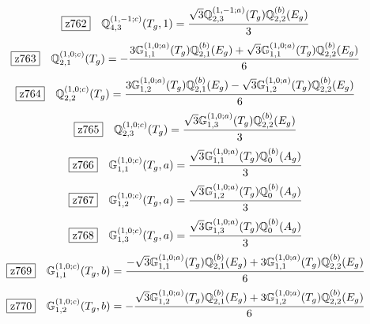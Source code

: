 \documentclass[fleqn,10pt,landscape]{jsarticle}
\begin{document}
\begin{dmath*}
\hspace*{3mm}\fbox{z762}\quad \mathbb{Q}_{4,3}^{(1,-1;c)}(T_{g},1)=\frac{\sqrt{3} \mathbb{Q}_{2,3}^{(1,-1;a)}(T_{g}) \mathbb{Q}_{2,2}^{(b)}(E_{g})}{3}
\end{dmath*}
\begin{dmath*}
\hspace*{3mm}\fbox{z763}\quad \mathbb{Q}_{2,1}^{(1,0;c)}(T_{g})=- \frac{3 \mathbb{G}_{1,1}^{(1,0;a)}(T_{g}) \mathbb{Q}_{2,1}^{(b)}(E_{g}) + \sqrt{3} \mathbb{G}_{1,1}^{(1,0;a)}(T_{g}) \mathbb{Q}_{2,2}^{(b)}(E_{g})}{6}
\end{dmath*}
\begin{dmath*}
\hspace*{3mm}\fbox{z764}\quad \mathbb{Q}_{2,2}^{(1,0;c)}(T_{g})=\frac{3 \mathbb{G}_{1,2}^{(1,0;a)}(T_{g}) \mathbb{Q}_{2,1}^{(b)}(E_{g}) - \sqrt{3} \mathbb{G}_{1,2}^{(1,0;a)}(T_{g}) \mathbb{Q}_{2,2}^{(b)}(E_{g})}{6}
\end{dmath*}
\begin{dmath*}
\hspace*{3mm}\fbox{z765}\quad \mathbb{Q}_{2,3}^{(1,0;c)}(T_{g})=\frac{\sqrt{3} \mathbb{G}_{1,3}^{(1,0;a)}(T_{g}) \mathbb{Q}_{2,2}^{(b)}(E_{g})}{3}
\end{dmath*}
\begin{dmath*}
\hspace*{3mm}\fbox{z766}\quad \mathbb{G}_{1,1}^{(1,0;c)}(T_{g},a)=\frac{\sqrt{3} \mathbb{G}_{1,1}^{(1,0;a)}(T_{g}) \mathbb{Q}_{0}^{(b)}(A_{g})}{3}
\end{dmath*}
\begin{dmath*}
\hspace*{3mm}\fbox{z767}\quad \mathbb{G}_{1,2}^{(1,0;c)}(T_{g},a)=\frac{\sqrt{3} \mathbb{G}_{1,2}^{(1,0;a)}(T_{g}) \mathbb{Q}_{0}^{(b)}(A_{g})}{3}
\end{dmath*}
\begin{dmath*}
\hspace*{3mm}\fbox{z768}\quad \mathbb{G}_{1,3}^{(1,0;c)}(T_{g},a)=\frac{\sqrt{3} \mathbb{G}_{1,3}^{(1,0;a)}(T_{g}) \mathbb{Q}_{0}^{(b)}(A_{g})}{3}
\end{dmath*}
\begin{dmath*}
\hspace*{3mm}\fbox{z769}\quad \mathbb{G}_{1,1}^{(1,0;c)}(T_{g},b)=\frac{- \sqrt{3} \mathbb{G}_{1,1}^{(1,0;a)}(T_{g}) \mathbb{Q}_{2,1}^{(b)}(E_{g}) + 3 \mathbb{G}_{1,1}^{(1,0;a)}(T_{g}) \mathbb{Q}_{2,2}^{(b)}(E_{g})}{6}
\end{dmath*}
\begin{dmath*}
\hspace*{3mm}\fbox{z770}\quad \mathbb{G}_{1,2}^{(1,0;c)}(T_{g},b)=- \frac{\sqrt{3} \mathbb{G}_{1,2}^{(1,0;a)}(T_{g}) \mathbb{Q}_{2,1}^{(b)}(E_{g}) + 3 \mathbb{G}_{1,2}^{(1,0;a)}(T_{g}) \mathbb{Q}_{2,2}^{(b)}(E_{g})}{6}
\end{dmath*}
\end{document}
